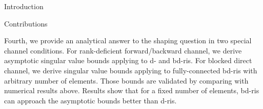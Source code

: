 \documentclass[journal]{IEEEtran}
\begin{document}
\begin{section}{Introduction}
\begin{subsection}{Contributions}

		Fourth, we provide an analytical answer to the shaping question in two special channel conditions.
		For rank-deficient forward/backward channel, we derive asymptotic singular value bounds applying to \gls{d}- and \gls{bd}-\gls{ris}.
		For blocked direct channel, we derive singular value bounds applying to fully-connected \gls{bd}-\gls{ris} with arbitrary number of elements.
		Those bounds are validated by comparing with numerical results above.
		Results show that for a fixed number of elements, \gls{bd}-\gls{ris} can approach the asymptotic bounds better than \gls{d}-\gls{ris}.





\end{subsection}
\end{section}
\end{document}
